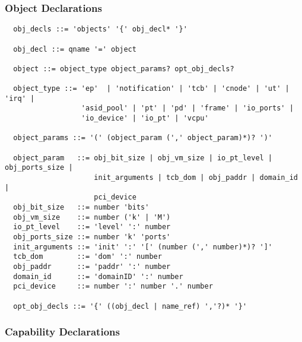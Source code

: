 \documentclass[a4paper,11pt]{article}
\begin{document}
\subsubsection{Object Declarations}

\begin{verbatim}
  obj_decls ::= 'objects' '{' obj_decl* '}'

  obj_decl ::= qname '=' object

  object ::= object_type object_params? opt_obj_decls?

  object_type ::= 'ep'  | 'notification' | 'tcb' | 'cnode' | 'ut' | 'irq' |
                  'asid_pool' | 'pt' | 'pd' | 'frame' | 'io_ports' |
                  'io_device' | 'io_pt' | 'vcpu'

  object_params ::= '(' (object_param (',' object_param)*)? ')'

  object_param   ::= obj_bit_size | obj_vm_size | io_pt_level | obj_ports_size |
                     init_arguments | tcb_dom | obj_paddr | domain_id |
                     pci_device
  obj_bit_size   ::= number 'bits'
  obj_vm_size    ::= number ('k' | 'M')
  io_pt_level    ::= 'level' ':' number
  obj_ports_size ::= number 'k' 'ports'
  init_arguments ::= 'init' ':' '[' (number (',' number)*)? ']'
  tcb_dom        ::= 'dom' ':' number
  obj_paddr      ::= 'paddr' ':' number
  domain_id      ::= 'domainID' ':' number
  pci_device     ::= number ':' number '.' number

  opt_obj_decls ::= '{' ((obj_decl | name_ref) ','?)* '}'
\end{verbatim}


\subsubsection{Capability Declarations}
\end{document}
